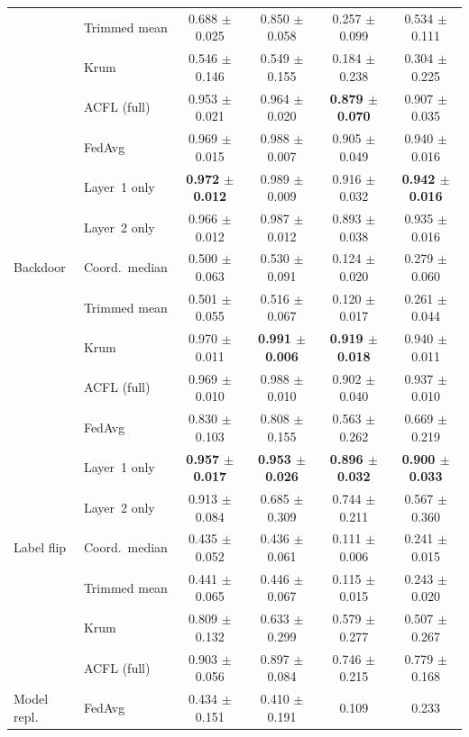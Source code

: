 \begin{table}[t]
{\begin{tabular}{llcccc}
 & Trimmed mean & 0.688 $\pm$ 0.025 & 0.850 $\pm$ 0.058 & 0.257 $\pm$ 0.099 & 0.534 $\pm$ 0.111 \\
 & Krum & 0.546 $\pm$ 0.146 & 0.549 $\pm$ 0.155 & 0.184 $\pm$ 0.238 & 0.304 $\pm$ 0.225 \\
 & ACFL (full) & 0.953 $\pm$ 0.021 & 0.964 $\pm$ 0.020 & \textbf{0.879 $\pm$ 0.070} & 0.907 $\pm$ 0.035 \\
\midrule
\multirow{7}{*}{Backdoor} & FedAvg & 0.969 $\pm$ 0.015 & 0.988 $\pm$ 0.007 & 0.905 $\pm$ 0.049 & 0.940 $\pm$ 0.016 \\
 & Layer~1 only & \textbf{0.972 $\pm$ 0.012} & 0.989 $\pm$ 0.009 & 0.916 $\pm$ 0.032 & \textbf{0.942 $\pm$ 0.016} \\
 & Layer~2 only & 0.966 $\pm$ 0.012 & 0.987 $\pm$ 0.012 & 0.893 $\pm$ 0.038 & 0.935 $\pm$ 0.016 \\
 & Coord.\ median & 0.500 $\pm$ 0.063 & 0.530 $\pm$ 0.091 & 0.124 $\pm$ 0.020 & 0.279 $\pm$ 0.060 \\
 & Trimmed mean & 0.501 $\pm$ 0.055 & 0.516 $\pm$ 0.067 & 0.120 $\pm$ 0.017 & 0.261 $\pm$ 0.044 \\
 & Krum & 0.970 $\pm$ 0.011 & \textbf{0.991 $\pm$ 0.006} & \textbf{0.919 $\pm$ 0.018} & 0.940 $\pm$ 0.011 \\
 & ACFL (full) & 0.969 $\pm$ 0.010 & 0.988 $\pm$ 0.010 & 0.902 $\pm$ 0.040 & 0.937 $\pm$ 0.010 \\
\midrule
\multirow{7}{*}{Label flip} & FedAvg & 0.830 $\pm$ 0.103 & 0.808 $\pm$ 0.155 & 0.563 $\pm$ 0.262 & 0.669 $\pm$ 0.219 \\
 & Layer~1 only & \textbf{0.957 $\pm$ 0.017} & \textbf{0.953 $\pm$ 0.026} & \textbf{0.896 $\pm$ 0.032} & \textbf{0.900 $\pm$ 0.033} \\
 & Layer~2 only & 0.913 $\pm$ 0.084 & 0.685 $\pm$ 0.309 & 0.744 $\pm$ 0.211 & 0.567 $\pm$ 0.360 \\
 & Coord.\ median & 0.435 $\pm$ 0.052 & 0.436 $\pm$ 0.061 & 0.111 $\pm$ 0.006 & 0.241 $\pm$ 0.015 \\
 & Trimmed mean & 0.441 $\pm$ 0.065 & 0.446 $\pm$ 0.067 & 0.115 $\pm$ 0.015 & 0.243 $\pm$ 0.020 \\
 & Krum & 0.809 $\pm$ 0.132 & 0.633 $\pm$ 0.299 & 0.579 $\pm$ 0.277 & 0.507 $\pm$ 0.267 \\
 & ACFL (full) & 0.903 $\pm$ 0.056 & 0.897 $\pm$ 0.084 & 0.746 $\pm$ 0.215 & 0.779 $\pm$ 0.168 \\
\midrule
\multirow{7}{*}{Model repl.} & FedAvg & 0.434 $\pm$ 0.151 & 0.410 $\pm$ 0.191 & 0.109 & 0.233 \\

\end{tabular}}
\end{table}
